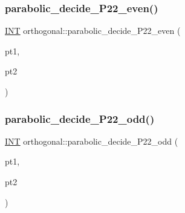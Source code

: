 \mbox{\label{classorthogonal_ae129c5beaabede756c4387aeb9c81854}} 
\subsubsection{\texorpdfstring{parabolic\+\_\+decide\+\_\+\+P22\+\_\+even()}{parabolic\_decide\_P22\_even()}}
{\footnotesize\ttfamily \mbox{\hyperlink{galois_8h_a09fddde158a3a20bd2dcadb609de11dc}{I\+NT}} orthogonal\+::parabolic\+\_\+decide\+\_\+\+P22\+\_\+even (\begin{DoxyParamCaption}\item[{\mbox{\hyperlink{galois_8h_a09fddde158a3a20bd2dcadb609de11dc}{I\+NT}}}]{pt1,  }\item[{\mbox{\hyperlink{galois_8h_a09fddde158a3a20bd2dcadb609de11dc}{I\+NT}}}]{pt2 }\end{DoxyParamCaption})}

\mbox{\label{classorthogonal_a621c30eb1f8131e8b29b240bd0a2b051}} 
\subsubsection{\texorpdfstring{parabolic\+\_\+decide\+\_\+\+P22\+\_\+odd()}{parabolic\_decide\_P22\_odd()}}
{\footnotesize\ttfamily \mbox{\hyperlink{galois_8h_a09fddde158a3a20bd2dcadb609de11dc}{I\+NT}} orthogonal\+::parabolic\+\_\+decide\+\_\+\+P22\+\_\+odd (\begin{DoxyParamCaption}\item[{\mbox{\hyperlink{galois_8h_a09fddde158a3a20bd2dcadb609de11dc}{I\+NT}}}]{pt1,  }\item[{\mbox{\hyperlink{galois_8h_a09fddde158a3a20bd2dcadb609de11dc}{I\+NT}}}]{pt2 }\end{DoxyParamCaption})}

\mbox{\label{classorthogonal_ab6af5eb5e517bf200419ae2cb0995f03}} 
